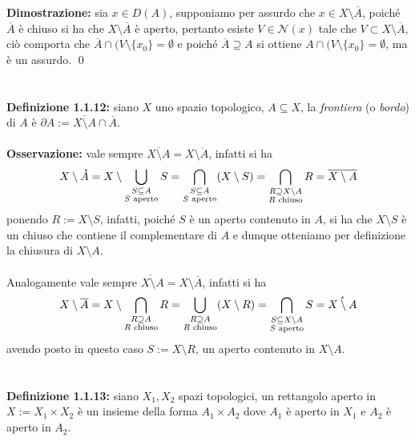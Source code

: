 \documentclass{article}
\begin{document}
\textbf{Dimostrazione:} sia $x \in D(A)$, supponiamo per assurdo che $x \in X \setminus \overline{A}$, poiché $\overline{A}$ è chiuso si ha che $X \setminus \overline{A}$ è aperto, pertanto esiste $V \in \mathcal{N}(x)$ tale che $V \subset X \setminus \overline{A}$, ciò comporta che $\overline{A} \cap (V \setminus \{x_0 \} = \emptyset$ e poiché $\overline{A} \supseteq A$ si ottiene $A \cap (V \setminus \{x_0 \} = \emptyset$, ma è un assurdo. \qed \\ \\ \\
\textbf{Definizione 1.1.12:} siano $X$ uno spazio topologico, $A \subseteq X$, la \textit{frontiera} (o \textit{bordo}) di $A$ è $\partial A := \overline{X \setminus A} \cap \overline{A}$. \\ \\ 
\textbf{Osservazione:} vale sempre $\overline{X \setminus A} = X \setminus \mathring{A}$, infatti si ha 
\begin{gather}
    X \setminus \mathring{A} = X \setminus \bigcup_{\substack{S \subseteq A \\ S \text{ aperto}}} S = \bigcap_{\substack{S \subseteq A \\ S \text{ aperto}}} (X \setminus S) = \bigcap_{\substack{R \supseteq X \setminus A \\ R \text{ chiuso}}} R = \overline{X \setminus A} \notag
\end{gather}
ponendo $R := X \setminus S$, infatti, poiché $S$ è un aperto contenuto in $A$, si ha che $X \setminus S$ è un chiuso che contiene il complementare di $A$ e dunque otteniamo per definizione la chiusura di $X \setminus A$. \\ \\
Analogamente vale sempre $\mathring{X \setminus A} = X \setminus \overline{A}$, infatti si ha
\begin{gather}
    X \setminus \overline{A} = X \setminus \bigcap_{\substack{R \supseteq A \\ R \text{ chiuso}}} R = \bigcup_{\substack{R \supseteq A \\ R \text{ chiuso}}} (X \setminus R) = \bigcap_{\substack{S \subseteq X \setminus A \\ S \text{ aperto}}} S = \mathring{X \setminus A} \notag
\end{gather}
avendo posto in questo caso $S := X \setminus R$, un aperto contenuto in $X \setminus A$. \\ \\ \\
\textbf{Definizione 1.1.13:} siano $X_1, X_2$ spazi topologici, un rettangolo aperto in $X := X_1 \times X_2$ è un insieme della forma $A_1 \times A_2$ dove $A_1$ è aperto in $X_1$ e $A_2$ è aperto in $A_2$. \\
\end{document}
